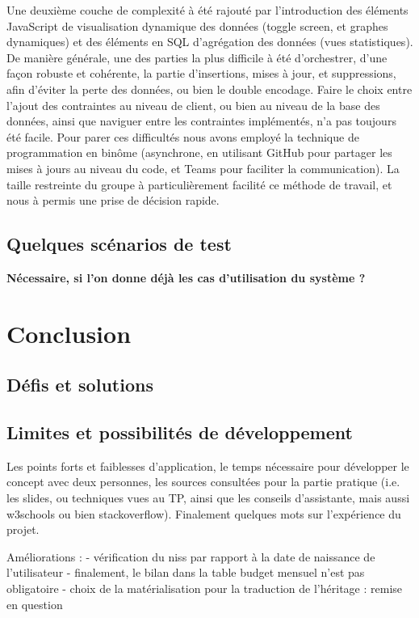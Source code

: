 \documentclass[a4paper,12pt]{article}
\begin{document}
Une deuxième couche de complexité à été rajouté par l'introduction des éléments JavaScript de visualisation dynamique des données (toggle screen, et graphes dynamiques) et des éléments en SQL d'agrégation des données (vues statistiques).
De manière générale, une des parties la plus difficile à été d'orchestrer, d'une façon robuste et cohérente, la partie d'insertions, mises à jour, et suppressions, afin d'éviter la perte des données, ou bien le double encodage.
Faire le choix entre l'ajout des contraintes au niveau de client, ou bien au niveau de la base des données, ainsi que naviguer entre les contraintes implémentés, n'a pas toujours été facile.
Pour parer ces difficultés nous avons employé la technique de programmation en binôme (asynchrone, en utilisant GitHub pour partager les mises à jours au niveau du code, et Teams pour faciliter la communication).
La taille restreinte du groupe à particulièrement facilité ce méthode de travail, et nous à permis une prise de décision rapide.

\subsection{Quelques scénarios de test }

\textbf{Nécessaire, si l'on donne déjà les cas d'utilisation du système ?}

\newpage
\section{Conclusion}

\subsection{Défis et solutions}
\subsection{Limites et possibilités de développement}
Les points forts et faiblesses d’application, le temps nécessaire pour développer le concept avec deux personnes, les sources consultées pour la partie pratique (i.e. les slides, ou techniques vues au TP, ainsi que les conseils d’assistante, mais aussi w3schools ou bien stackoverflow).
Finalement quelques mots sur l'expérience du projet.

Améliorations : 
- vérification du niss par rapport à la date de naissance de l'utilisateur
- finalement, le bilan dans la table budget mensuel n'est pas obligatoire
- choix de la matérialisation pour la traduction de l'héritage : remise en question
\end{document}
